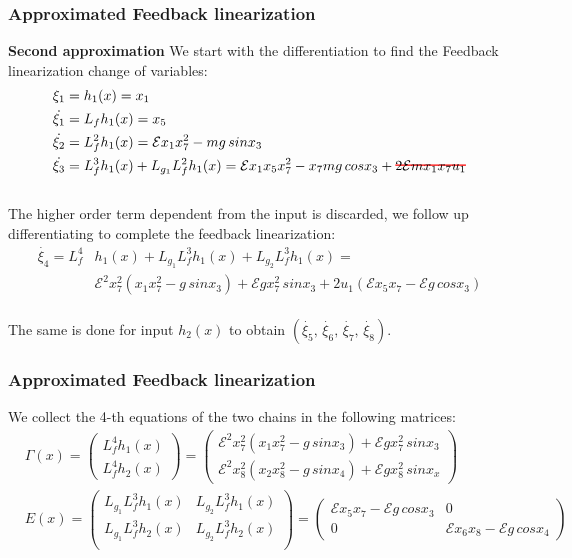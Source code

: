 %
\begin{frame}
\frametitle{Approximated Feedback linearization}
\textbf{Second approximation}\newline
We start with the differentiation to find the Feedback linearization change of variables:
\begin{equation*}
\begin{aligned}
&\xi_1 = h_1(x) = x_1 \\
&\dot{\xi_1} = L_fh_1(x) = x_5 \\
&\dot{\xi_2} = L^2_fh_1(x) = \mathcal{E}x_1x^2_7 - mg\,sinx_3 \\
&\dot{\xi_3} = L^3_fh_1(x) + L_{g_1}L^2_fh_1(x) = \mathcal{E}x_1x_5x^2_7 - x_7mg\,cosx_3 + \hcancel[red]{2\mathcal{E}mx_1x_7u_1}
\end{aligned}
\end{equation*}\\[8pt]
The higher order term dependent from the input is discarded, we follow up differentiating to complete the feedback linearization:
\begin{equation*}
\begin{aligned}
\dot{\xi_4} = L^4_f&h_1(x) + L_{g_1}L^3_fh_1(x) + L_{g_2}L^3_fh_1(x) = \\
&\mathcal{E}^2x^2_7(x_1x^2_7 - g\,sinx_3) + \mathcal{E}gx^2_7\,sinx_3 + 2u_1(\mathcal{E}x_5x_7 - \mathcal{E}g\,cosx_3)
\end{aligned}
\end{equation*}\\[8pt]
The same is done for input $h_2(x)$ to obtain $\left(\dot{\xi_5},\,\dot{\xi_6},\,\dot{\xi_7},\,\dot{\xi_8}\right)$.
\end{frame}
%
\begin{frame}
\frametitle{Approximated Feedback linearization}
We collect the 4-th equations of the two chains in the following matrices:
\begin{align}
 	&\Gamma(x) =%
 	\begin{pmatrix}
 		L^4_fh_1(x)\\
 		L^4_fh_2(x)
 	\end{pmatrix}=%
 	\begin{pmatrix}
 		\mathcal{E}^2x^2_7(x_1x^2_7 - g\,sinx_3) + \mathcal{E}gx^2_7\,sinx_3 \\
 		\mathcal{E}^2x^2_8(x_2x^2_8 - g\,sinx_4) + \mathcal{E}gx^2_8\,sinx_x
 	\end{pmatrix}\nonumber\\[8pt]
 	&E(x)=%
 	\begin{pmatrix}
 		L_{g_1}L^3_fh_1(x) &L_{g_2}L^3_fh_1(x) \\
 		L_{g_1}L^3_fh_2(x) &L_{g_2}L^3_fh_2(x) \\
 	\end{pmatrix}=%
 	\begin{pmatrix}
 		\mathcal{E}x_5x_7 - \mathcal{E}g\,cosx_3 &0\\
 		0 &\mathcal{E}x_6x_8 - \mathcal{E}g\,cosx_4
 	\end{pmatrix}\nonumber
\end{align}\\[8pt]
\end{frame}

